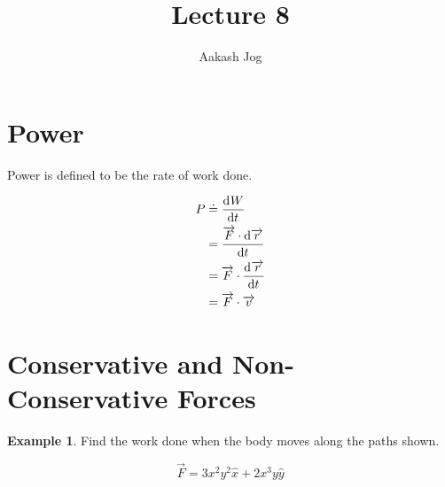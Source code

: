 \documentclass[fleqn]{article}
\title{Lecture 8}
\author{Aakash Jog}
\date{\formatdate{20}{11}{2014}}
\theoremstyle{definition}
\newtheorem{example}{Example}
\theoremstyle{theorem}
\begin{document}
\maketitle

\tableofcontents

\newpage
\section{Power}

Power is defined to be the rate of work done.

\begin{align*}
	P &\doteq \dod{W}{t} \\
	&= \dfrac{\overrightarrow{F} \cdot \dif \overrightarrow{r}}{\dif t} \\
	&= \overrightarrow{F} \cdot \dod{\overrightarrow{r}}{t} \\
	&= \overrightarrow{F} \cdot \overrightarrow{v}
\end{align*}

\section{Conservative and Non-Conservative Forces}

\begin{example}
	Find the work done when the body moves along the paths shown.
	\begin{equation*}
		\overrightarrow{F} = 3 x^2 y^2 \hat{x} + 2 x^3 y \hat{y}
	\end{equation*}
\end{example}
\end{document}
